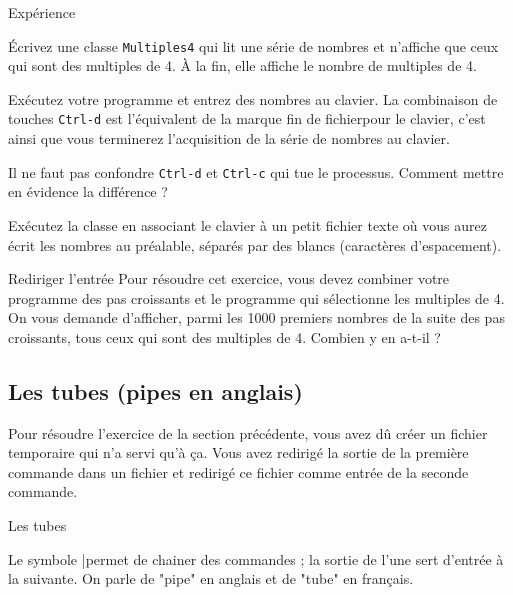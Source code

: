 \documentclass[a4paper,11pt]{article}
\begin{document}
		\begin{Tutoriel}{Exp\'erience} 
				\begin{steps}
					\item Écrivez une classe \verb_Multiples4_ qui lit une série de nombres et n'affiche que ceux qui sont des multiples de 4. 
					À la fin, elle affiche le nombre de multiples de 4.
			
					\item Exécutez votre programme et entrez des nombres au clavier.
						La combinaison de touches \verb_Ctrl-d_ est l'\'equivalent de la marque \guillemotleft fin de fichier\guillemotright  pour le clavier,
						c'est ainsi que vous terminerez l'acquisition de la s\'erie de nombres au clavier.
					
					\item Il ne faut pas confondre \verb_Ctrl-d_ et \verb_Ctrl-c_
						qui tue le processus. Comment mettre en \'evidence la diff\'erence ?
					
					\item Ex\'ecutez la classe en associant le clavier 
						\`a un petit fichier texte o\`u vous aurez \'ecrit les nombres au pr\'ealable,
						s\'epar\'es par des blancs (caractères d'espacement).						
					
				\end{steps}
		\end{Tutoriel}
				
			
		\begin{Exercice}{Rediriger l'entrée} 
			Pour r\'esoudre cet exercice, vous devez combiner votre programme des pas croissants
			et le programme qui s\'electionne les multiples de 4. On vous demande d'afficher,
			parmi les 1000 premiers nombres de la suite des pas croissants, tous ceux qui sont des multiples de 4.
			Combien y en a-t-il ?
		\end{Exercice}
            		
        \subsection{Les tubes (pipes en anglais)}
Pour r\'esoudre l'exercice de la section pr\'ec\'edente, vous avez d\^u cr\'eer un fichier
temporaire qui n'a servi qu'\`a \c ca. Vous avez redirig\'e la sortie de la premi\`ere commande dans un fichier et
redirig\'e ce fichier comme entr\'ee de la seconde commande.
					
			\begin{coltbox}{Les tubes}
		
				Le symbole \guillemotleft |\guillemotright  permet de chainer des commandes ; la sortie de l'une sert d'entr\'ee \`a la suivante. 
				On parle de "pipe" en anglais et de "tube" en fran\c cais.
					
			\end{coltbox}
\end{document}
